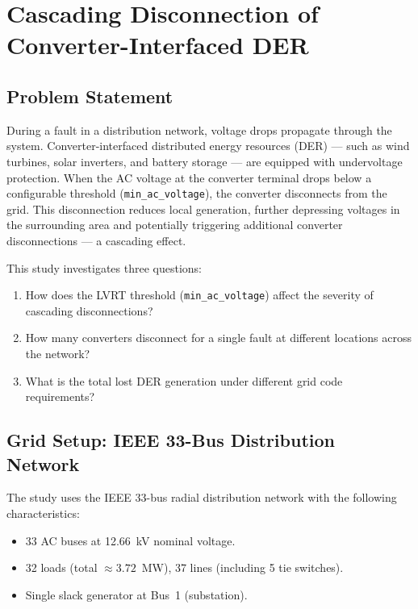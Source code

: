 
\section{Cascading Disconnection of Converter-Interfaced DER}
\label{sec:cascading}

\subsection{Problem Statement}
\label{sec:problem}

During a fault in a distribution network, voltage drops propagate through the system. Converter-interfaced distributed energy resources (DER) --- such as wind turbines, solar inverters, and battery storage --- are equipped with undervoltage protection. When the AC voltage at the converter terminal drops below a configurable threshold (\texttt{min\_ac\_voltage}), the converter disconnects from the grid. This disconnection reduces local generation, further depressing voltages in the surrounding area and potentially triggering additional converter disconnections --- a cascading effect.

This study investigates three questions:
\begin{enumerate}
    \item How does the LVRT threshold (\texttt{min\_ac\_voltage}) affect the severity of cascading disconnections?
    \item How many converters disconnect for a single fault at different locations across the network?
    \item What is the total lost DER generation under different grid code requirements?
\end{enumerate}


\subsection{Grid Setup: IEEE 33-Bus Distribution Network}
\label{sec:grid_setup}

The study uses the IEEE 33-bus radial distribution network with the following characteristics:
\begin{itemize}
    \item 33 AC buses at 12.66~kV nominal voltage.
    \item 32 loads (total $\approx 3.72$~MW), 37 lines (including 5 tie switches).
    \item Single slack generator at Bus~1 (substation).
\end{itemize}

